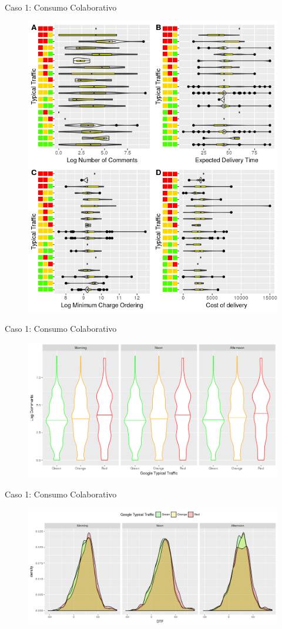 \documentclass{beamer}
\begin{document}
\begin{frame}{Caso 1: Consumo Colaborativo}
\begin{figure}
\centering
 \includegraphics[width=.45\textwidth]{Fig1}
\end{figure}
\end{frame}

\begin{frame}{Caso 1: Consumo Colaborativo}
\begin{figure}
\centering
 \includegraphics[width=.85\textwidth]{Fig2}
\end{figure}
\end{frame}

\begin{frame}{Caso 1: Consumo Colaborativo}
\begin{figure}
\centering
 \includegraphics[width=.95\textwidth]{Fig3}
\end{figure}
\end{frame}
\end{document}

